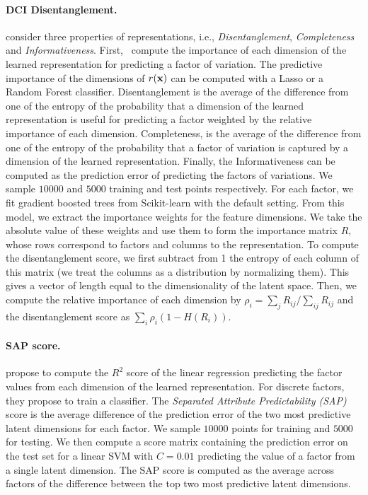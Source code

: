  \paragraph{DCI Disentanglement.}
 \citet{eastwood2018framework} consider three properties of representations, i.e., \emph{Disentanglement}, \emph{Completeness} and \emph{Informativeness}.
First,~\citet{eastwood2018framework} compute the importance of each dimension of the learned representation for predicting a factor of variation. 
The predictive importance of the dimensions of $r({\mathbf{x}})$ can be computed with a Lasso or a Random Forest classifier.
Disentanglement is the average of the difference from one of the entropy of the probability that a dimension of the learned representation is useful for predicting a factor weighted by the relative importance of each dimension. 
Completeness, is the average of the difference from one of the entropy of the probability that a factor of variation is captured by a dimension of the learned representation. 
Finally, the Informativeness can be computed as the prediction error of predicting the factors of variations.
 We sample $\num{10000}$ and $\num{5000}$ training and test points respectively. 
 For each factor, we fit gradient boosted trees from Scikit-learn with the default setting. 
 From this model, we extract the importance weights for the feature dimensions. 
 We take the absolute value of these weights and use them to form the importance matrix $R$, whose rows correspond to factors and columns to the representation. 
 To compute the disentanglement score, we first subtract from 1 the entropy of each column of this matrix (we treat the columns as a distribution by normalizing them). 
 This gives a vector of length equal to the dimensionality of the latent space. 
 Then, we compute the relative importance of each dimension by $\rho_i = \sum_j R_{ij}/\sum_{ij} R_{ij}$ and the disentanglement score as $\sum_i \rho_i (1-H(R_i))$. 
 
 \paragraph{SAP score.}
 \citet{kumar2017variational} propose to compute the $R^2$ score of the linear regression predicting the factor values from each dimension of the learned representation. 
For discrete factors, they propose to train a classifier. 
The \emph{Separated Attribute Predictability (SAP)} score is the average difference of the prediction error of the two most predictive latent dimensions for each factor.
 We sample $\num{10000}$ points for training and $\num{5000}$ for testing.
 We then compute a score matrix containing the prediction error on the test set for a linear SVM with $C=0.01$ predicting the value of a factor from a single latent dimension. 
 The SAP score is computed as the average across factors of the difference between the top two most predictive latent dimensions.
 
